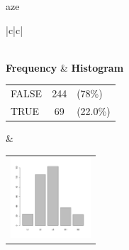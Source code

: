 


 aze 
  \begin{center}
    \addtolength{\leftskip}{-4cm}\addtolength{\rightskip}{-4cm}
    \begin{tabular}{|c|c|}

      \hline
        \\
      \hline
        {\bf Frequency} & {\bf Histogram}  \\
          \begin{tabular}{@{}l@{ : }cl@{}}
            FALSE & 244 &(78\%) \\
            TRUE & 69 &(22.0\%) \\
          \end{tabular}
      &
          \begin{tabular}{@{}l@{}}
            \includegraphics[width=3cm]{graphUniv/V-barplot}
          \end{tabular}
      \\ \hline 

    \end{tabular}
  \end{center}
  
  
